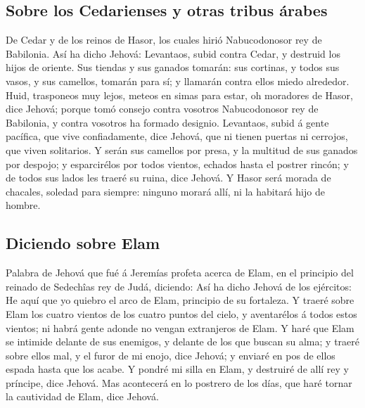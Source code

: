 \hypertarget{sobre-los-cedarienses-y-otras-tribus-uxe1rabes}{%
\subsection{Sobre los Cedarienses y otras tribus
árabes}\label{sobre-los-cedarienses-y-otras-tribus-uxe1rabes}}

 De Cedar y de los reinos de Hasor, los cuales hirió
Nabucodonosor rey de Babilonia. Así ha dicho Jehová: Levantaos, subid
contra Cedar, y destruid los hijos de oriente.  Sus
tiendas y sus ganados tomarán: sus cortinas, y todos sus vasos, y sus
camellos, tomarán para sí; y llamarán contra ellos miedo alrededor.
 Huid, trasponeos muy lejos, meteos en simas para estar,
oh moradores de Hasor, dice Jehová; porque tomó consejo contra vosotros
Nabucodonosor rey de Babilonia, y contra vosotros ha formado designio.
 Levantaos, subid á gente pacífica, que vive
confiadamente, dice Jehová, que ni tienen puertas ni cerrojos, que viven
solitarios.  Y serán sus camellos por presa, y la
multitud de sus ganados por despojo; y esparcirélos por todos vientos,
echados hasta el postrer rincón; y de todos sus lados les traeré su
ruina, dice Jehová.  Y Hasor será morada de chacales,
soledad para siempre: ninguno morará allí, ni la habitará hijo de
hombre.

\hypertarget{diciendo-sobre-elam}{%
\subsection{Diciendo sobre Elam}\label{diciendo-sobre-elam}}

 Palabra de Jehová que fué á Jeremías profeta acerca de
Elam, en el principio del reinado de Sedechîas rey de Judá, diciendo:
 Así ha dicho Jehová de los ejércitos: He aquí que yo
quiebro el arco de Elam, principio de su fortaleza.  Y
traeré sobre Elam los cuatro vientos de los cuatro puntos del cielo, y
aventarélos á todos estos vientos; ni habrá gente adonde no vengan
extranjeros de Elam.  Y haré que Elam se intimide delante
de sus enemigos, y delante de los que buscan su alma; y traeré sobre
ellos mal, y el furor de mi enojo, dice Jehová; y enviaré en pos de
ellos espada hasta que los acabe.  Y pondré mi silla en
Elam, y destruiré de allí rey y príncipe, dice Jehová. 
Mas acontecerá en lo postrero de los días, que haré tornar la cautividad
de Elam, dice Jehová.

